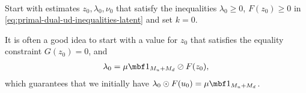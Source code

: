 \documentclass[11pt]{article}
\begin{document}
\begin{algorithm}~\label{al:primal-dual-latent}
\begin{steps}
\item Start with estimates $z_0,\lambda_0,\nu_0$ that satisfy the inequalities
  $\lambda_0\ge 0$, $F(z_0)\ge 0$ in \eqref{eq:primal-dual-ud-inequalities-latent} and set $k=0$.

  It is often a good idea to start with a value for $z_0$ that
  satisfies the equality constraint $G(z_0)=0$, and
  \begin{align*}
    \lambda_0=\mu\mbf 1_{M_u+M_d}\oslash F(z_0),
  \end{align*}
  which guarantees that we initially have
  $\lambda_0\odot F(u_0)=\mu\mbf 1_{M_u+M_d}$.



\end{steps}
\end{algorithm}
\end{document}
